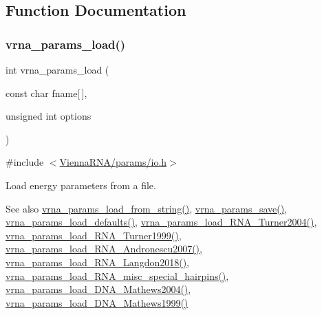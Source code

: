 \subsection{Function Documentation}
\mbox{\label{group__energy__parameters__rw_gabb0583595c67094986ef90cb4f1c7555}} 
\subsubsection{\texorpdfstring{vrna\_params\_load()}{vrna\_params\_load()}}
{\footnotesize\ttfamily int vrna\+\_\+params\+\_\+load (\begin{DoxyParamCaption}\item[{const char}]{fname\mbox{[}$\,$\mbox{]},  }\item[{unsigned int}]{options }\end{DoxyParamCaption})}



{\ttfamily \#include $<$\mbox{\hyperlink{io_8h}{Vienna\+R\+N\+A/params/io.\+h}}$>$}



Load energy parameters from a file. 

\begin{DoxySeeAlso}{See also}
\mbox{\hyperlink{group__energy__parameters__rw_gabcd9cc7040a6b633b56b1cbd6a14d68e}{vrna\+\_\+params\+\_\+load\+\_\+from\+\_\+string()}}, \mbox{\hyperlink{group__energy__parameters__rw_ga0de3731b3e4017c52bd678549f6c4ae5}{vrna\+\_\+params\+\_\+save()}}, \mbox{\hyperlink{group__energy__parameters__rw_ga413bc688695c9a707dbcc678412d6792}{vrna\+\_\+params\+\_\+load\+\_\+defaults()}}, \mbox{\hyperlink{group__energy__parameters__rw_ga7327fe66ef60c33ba80a87c04db0ee83}{vrna\+\_\+params\+\_\+load\+\_\+\+R\+N\+A\+\_\+\+Turner2004()}}, \mbox{\hyperlink{group__energy__parameters__rw_ga804393b6dfe06a2c6cae89219dffabb1}{vrna\+\_\+params\+\_\+load\+\_\+\+R\+N\+A\+\_\+\+Turner1999()}}, \mbox{\hyperlink{group__energy__parameters__rw_ga511a1c17c0fd10a1fbb0936674712ff8}{vrna\+\_\+params\+\_\+load\+\_\+\+R\+N\+A\+\_\+\+Andronescu2007()}}, \mbox{\hyperlink{group__energy__parameters__rw_ga3a87fe5e73eb906c0fa26f2c42c787fd}{vrna\+\_\+params\+\_\+load\+\_\+\+R\+N\+A\+\_\+\+Langdon2018()}}, \mbox{\hyperlink{group__energy__parameters__rw_ga00e07504d66dc24aca7befb4bdaa0db1}{vrna\+\_\+params\+\_\+load\+\_\+\+R\+N\+A\+\_\+misc\+\_\+special\+\_\+hairpins()}}, \mbox{\hyperlink{group__energy__parameters__rw_gafa45b5734355baa634ca0a2e2857563e}{vrna\+\_\+params\+\_\+load\+\_\+\+D\+N\+A\+\_\+\+Mathews2004()}}, \mbox{\hyperlink{group__energy__parameters__rw_ga4d897130a700f86b7d4035a95f25615a}{vrna\+\_\+params\+\_\+load\+\_\+\+D\+N\+A\+\_\+\+Mathews1999()}}
\end{DoxySeeAlso}

